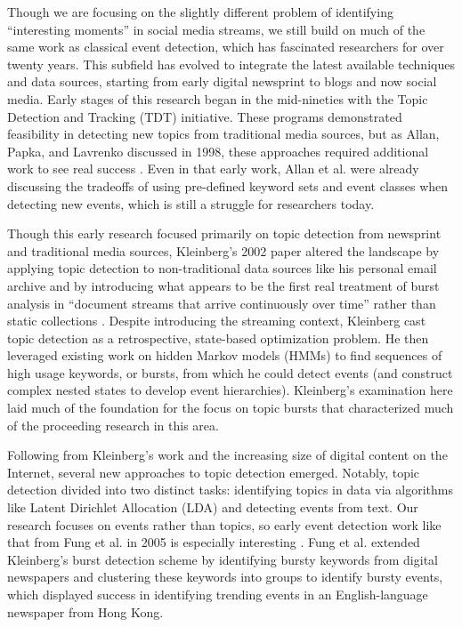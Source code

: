 \documentclass{sig-alternate}
\begin{document}
Though we are focusing on the slightly different problem of identifying ``interesting moments'' in social media streams, we still build on much of the same work as classical event detection, which has fascinated researchers for over twenty years.
This subfield has evolved to integrate the latest available techniques and data sources, starting from early digital newsprint to blogs and now social media.
Early stages of this research began in the mid-nineties with the Topic Detection and Tracking (TDT) initiative.
These programs demonstrated feasibility in detecting new topics from traditional media sources, but as Allan, Papka, and Lavrenko discussed in 1998, these approaches required additional work to see real success \cite{allan1998line}.
Even in that early work, Allan et al. were already discussing the tradeoffs of using pre-defined keyword sets and event classes when detecting new events, which is still a struggle for researchers today.

Though this early research focused primarily on topic detection from newsprint and traditional media sources, Kleinberg's 2002 paper altered the landscape by applying topic detection to non-traditional data sources like his personal email archive and by introducing what appears to be the first real treatment of burst analysis in ``document streams that arrive continuously over time'' rather than  static collections \cite{Kleinberg:2002:BHS:775047.775061}. 
Despite introducing the streaming context, Kleinberg cast topic detection as a retrospective, state-based optimization problem.
He then leveraged existing work on hidden Markov models (HMMs) to find sequences of high usage keywords, or bursts, from which he could detect events (and construct complex nested states to develop event hierarchies).
Kleinberg's examination here laid much of the foundation for the focus on topic bursts that characterized much of the proceeding research in this area.

Following from Kleinberg's work and the increasing size of digital content on the Internet, several new approaches to topic detection emerged.
Notably, topic detection divided into two distinct tasks: identifying topics in data via algorithms like Latent Dirichlet Allocation (LDA) \cite{blei2003latent} and detecting events from text.
Our research focuses on events rather than topics, so early event detection work like that from Fung et al. in 2005 is especially interesting \cite{Fung:2005:PFB:1083592.1083616}.
Fung et al. extended Kleinberg's burst detection scheme by identifying bursty keywords from digital newspapers and clustering these keywords into groups to identify bursty events, which displayed success in identifying trending events in an English-language newspaper from Hong Kong.
\end{document}
